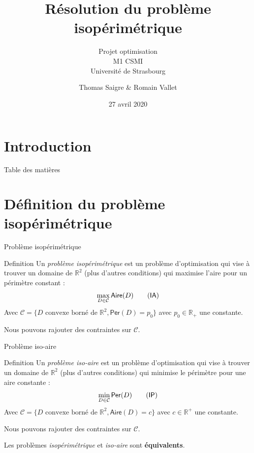 \documentclass[11pt,envcountsect,aspectratio=169]{beamer} %
\author[Thomas S. \& Romain V.]{Thomas Saigre \& Romain Vallet}
\title{Résolution du problème isopérimétrique}
\subtitle{Projet optimisation \\ M1 CSMI \\ Université de Strasbourg}
\date{27 avril 2020}
\newcommand{\frametitre}{\begin{frame}
    \begin{center}
    {\Large\bf \secname}
    \end{center}
    \end{frame}
}
\newcommand{\R}{\mathbb{R}}
\newcommand{\C}{\mathcal{C}}
\newcommand{\A}{\mathsf{Aire}}
\newcommand{\p}{\mathsf{Per}}
\newcommand{\IA}{\textsf{IA}}
\newcommand{\IP}{\textsf{IP}}
\begin{document}
\begin{frame}[plain]
\titlepage
\end{frame}


\section[Introduction]{Introduction}




\begin{frame}{Table des matières}
\tableofcontents[hideallsubsections]
\end{frame}




\section{Définition du problème isopérimétrique}

\begin{frame}{Problème isopérimétrique}

\begin{beamerboxesrounded}[upper=titreB,lower=texteB,shadow=true]{Definition}
        Un \emph{problème isopérimétrique} est un problème d'optimisation qui vise à trouver un domaine de $\R^2$ (plus d'autres conditions) qui maximise l'aire pour un périmètre constant :
        \[\max_{D \in \C} \A(D) \label{ia}\tag{\IA}\]
        Avec $\mathcal{C} = \{ D \text{ convexe borné de } \R^2, \p(D) = p_0 \}$ avec $p_0 \in \R_+$ une constante.
\end{beamerboxesrounded}

Nous pouvons rajouter des contraintes sur $\C$.

\end{frame}

\begin{frame}{Problème iso-aire}

\begin{beamerboxesrounded}[upper=titreB,lower=texteB,shadow=true]{Definition}
        Un \emph{problème iso-aire} est un problème d'optimisation qui vise à trouver un domaine de $\R^2$ (plus d'autres conditions) qui minimise le périmètre pour une aire constante :
        \[\min_{D \in \C} \p(D) \label{ip}\tag{\IP}\]
        Avec $\mathcal{C} = \{ D \text{ convexe borné de } \R^2, \A(D)=c \}$ avec $c \in \R^+$ une constante.
\end{beamerboxesrounded}

Nous pouvons rajouter des contraintes sur $\C$.

\vspace{\baselineskip}
Les problèmes \emph{isopérimétrique} et \emph{iso-aire} sont \textbf{équivalents}.

\end{frame}
\end{document}
